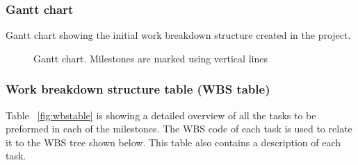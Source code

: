 \subsubsection{Gantt chart}
Gantt chart showing the initial work breakdown structure created in the project.
\begin{figure}[H]
\caption{Gantt chart. Milestones are marked using vertical lines}
\end{figure}

\subsubsection{Work breakdown structure table (WBS table)}
Table ~\ref{fig:wbstable} is showing a detailed overview of all the tasks to be preformed in each of the milestones. The WBS code of each task is used to relate it to the WBS tree shown below. This table also contains a description of each task.



